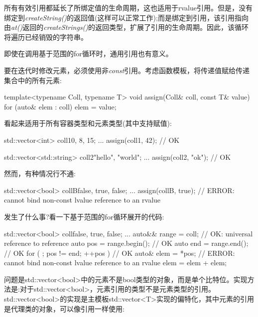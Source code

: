 所有有效引用都延长了所绑定值的生命周期，这也适用于rvalue引用。但是，没有绑定到\textit{createString(\allowbreak{})\allowbreak{}}的返回值(这样可以正常工作);而是绑定到引用，该引用指向由\textit{at()}返回的\textit{createStrings(\allowbreak{})\allowbreak{}}的返回类型，扩展了引用的生命周期。因此，该循环将遍历已经销毁的字符串。\par


即使在调用基于范围的for循环时，通用引用也有意义。\par

要在迭代时修改元素，必须使用非\textit{const}引用。考虑函数模板，将传递值赋给传递集合中的所有元素:\par

\begin{codebox}[cpp]
template<typename Coll, typename T>
void assign(Coll& coll, const T& value) {
  for (auto& elem : coll) {
    elem = value;
  }
}
\end{codebox}

看起来适用于所有容器类型和元素类型(其中支持赋值):\par

\begin{codebox}[cpp]
std::vector<int> coll1{0, 8, 15};
...
assign(coll1, 42); // OK

std::vector<std::string> coll2{"hello", "world"};
...
assign(coll2, "ok"); // OK
\end{codebox}

然而，有种情况行不通:\par

\begin{codebox}[cpp]
std::vector<bool> collB{false, true, false};
...
assign(collB, true); // ERROR: cannot bind non-const lvalue reference to an rvalue
\end{codebox}

发生了什么事?看一下基于范围的for循环展开的代码:\par

\begin{codebox}[cpp]
std::vector<bool> coll{false, true, false};
...
{
  auto&& range = coll; // OK: universal reference to reference
  auto pos = range.begin(); // OK
  auto end = range.end(); // OK
  for ( ; pos != end; ++pos ) { // OK
    auto& elem = *pos; // ERROR: cannot bind non-const lvalue reference to an rvalue
    elem = elem + elem;
  }
}
\end{codebox}

问题是std::vector<bool>中的元素不是bool类型的对象，而是单个比特位。实现方法是:对于std::vector<bool>，元素引用的类型不是元素类型的引用。std::\allowbreak{}vector<\allowbreak{}bool>的实现是主模板std::vector<T>实现的偏特化，其中元素的引用是代理类的对象，可以像引用一样使用:\par

